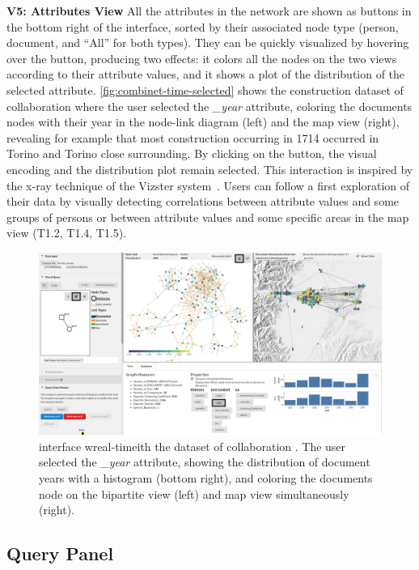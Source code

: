 \noindent\textbf{V5: Attributes View}
All the attributes in the network are shown as buttons in the bottom right of the interface, sorted by their associated node type (person, document, and ``All'' for both types).
They can be quickly visualized by hovering over the button, producing two effects: it colors all the nodes on the two views according to their attribute values, and it shows a plot of the distribution of the selected attribute. \autoref{fig:combinet-time-selected} shows the construction dataset of collaboration \pascal where the user selected the \textit{\_year} attribute, coloring the documents nodes with their year in the node-link diagram (left) and the map view (right), revealing for example that most construction occurring in 1714 occurred in Torino and Torino close surrounding.
By clicking on the button, the visual encoding and the distribution plot remain selected.
 This interaction is inspired by the x-ray technique of the Vizster system~\cite{heerVizsterVisualizingOnline2005}.
Users can follow a first exploration of their data by visually detecting correlations between attribute values and some groups of persons or between attribute values and some specific areas in the map view (T1.2, T1.4, T1.5).

\begin{figure}[!ht]
 \centering
    \includegraphics[trim={15.9cm 0 0 0},clip,width=\textwidth]{static/figures/ComBiNet/Piemont_timeSelected.png}
    \caption{\name interface wreal-timeith the dataset of collaboration \pascal. The user selected the \textit{\_year} attribute, showing the distribution of document years with a histogram (bottom right), and coloring the documents node on the bipartite view (left) and map view simultaneously (right).}\label{fig:combinet-time-selected}
\end{figure}

\subsection{Query Panel}

